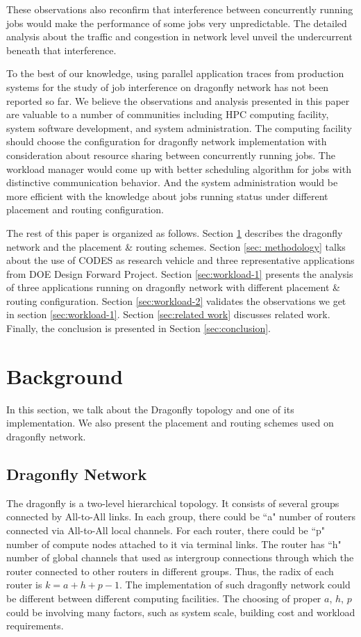 \documentclass[conference,compsoc]{IEEEtran}
\begin{document}
These observations also reconfirm that interference between concurrently running jobs would make the performance of some jobs very unpredictable. The detailed analysis about the traffic and congestion in network level unveil the undercurrent beneath that interference. 

To the best of our knowledge, using parallel application traces from production systems for the study of job interference on dragonfly network has not been reported so far. We believe the observations and analysis presented in this paper are valuable to a number of communities including HPC computing facility, system software development, and system administration. The computing facility should choose the configuration for dragonfly network implementation with consideration about resource sharing between concurrently running jobs. The workload manager would come up with better scheduling algorithm for jobs with distinctive communication behavior. And the system administration would be more efficient with the knowledge about jobs running status under different placement and routing configuration.

The rest of this paper is organized as follows. Section \ref{sec:background} describes the dragonfly network and the placement \& routing schemes. Section \ref{sec: methodology} talks about the use of CODES as research vehicle and three representative applications from DOE Design Forward Project. Section \ref{sec:workload-1} presents the analysis of three applications running on dragonfly network with different placement \& routing configuration. Section \ref{sec:workload-2} validates the observations we get in section \ref{sec:workload-1}. Section \ref{sec:related work} discusses related work. Finally, the conclusion is presented in Section \ref{sec:conclusion}.

\section{Background}
\label{sec:background}

In this section, we talk about the Dragonfly topology and one of its implementation. We also present the placement and routing schemes  used on dragonfly network.

\subsection{Dragonfly Network}
\label{sec:network}
The dragonfly is a two-level hierarchical topology. It consists of several groups connected by All-to-All links. In each group, there could be ``a" number of routers connected via All-to-All local channels. For each router, there could be ``p" number of compute nodes attached to it via terminal links. The router has ``h" number of global channels that used as intergroup connections through which the router connected to other routers in different groups. Thus, the radix of each router is $k = a+h+p-1$. The implementation of such dragonfly network could be different between different computing facilities. The choosing of proper $a$, $h$, $p$ could be involving many factors, such as system scale, building cost and workload requirements. 
\end{document}
